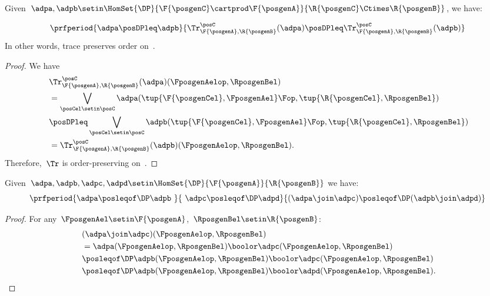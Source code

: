 \begin{lemma}
    \label{lem:trace_pres_order}
    Given~$\adpa,\adpb\setin \HomSet{\DP}{\F{\posgenC}\cartprod \F{\posgenA}}{\R{\posgenC}\Ctimes \R{\posgenB}}$, we have:

    \begin{equation}
        \prfperiod{\adpa\posDPleq \adpb}{\Tr_{\F{\posgenA},\R{\posgenB}}^\posC(\adpa)\posDPleq \Tr_{\F{\posgenA},\R{\posgenB}}^\posC(\adpb)}
    \end{equation}
    In other words, trace preserves order on~\DP.
\end{lemma}

\begin{proof}
    We have
    \begin{equation}
        \label{eq:trace_pres_ord}
        \begin{aligned}
            ~ & \Tr_{\F{\posgenA},\R{\posgenB}}^\posC(\adpa)(\FposgenAelop,\RposgenBel) \\
              & = \bigvee_{\posCel\setin \posC}\adpa(\tup{\F{\posgenCel},\FposgenAel}\Fop,\tup{\R{\posgenCel},\RposgenBel}) \\
              & \posDPleq \bigvee_{\posCel\setin \posC}\adpb(\tup{\F{\posgenCel},\FposgenAel}\Fop,\tup{\R{\posgenCel},\RposgenBel}) \\
              & =\Tr_{\F{\posgenA},\R{\posgenB}}^\posC(\adpb)(\FposgenAelop,\RposgenBel).
        \end{aligned}
    \end{equation}
    Therefore,~$\Tr$ is order-preserving on~\DP.
\end{proof}

\begin{lemma}
    \label{lem:coprod_mon}
    Given~$\adpa,\adpb,\adpc,\adpd \setin \HomSet{\DP}{\F{\posgenA}}{\R{\posgenB}}$ we have:
    \begin{equation}
        \prfperiod{\adpa\posleqof\DP \adpb\ }{\ \adpc\posleqof\DP\adpd}{(\adpa\join\adpc)\posleqof\DP (\adpb\join \adpd)}
    \end{equation}
\end{lemma}
\begin{proof}
    For any~$\FposgenAel\setin \F{\posgenA}$,~$\RposgenBel\setin \R{\posgenB}$:
    \begin{equation}
        \begin{aligned}
            ~ & (\adpa \join \adpc)(\FposgenAelop,\RposgenBel) \\
              & =\adpa(\FposgenAelop,\RposgenBel)\boolor \adpc(\FposgenAelop,\RposgenBel) \\
              & \posleqof\DP \adpb(\FposgenAelop,\RposgenBel)\boolor \adpc(\FposgenAelop,\RposgenBel) \\
              & \posleqof\DP \adpb(\FposgenAelop,\RposgenBel)\boolor \adpd(\FposgenAelop,\RposgenBel).
        \end{aligned}
    \end{equation}
\end{proof}

